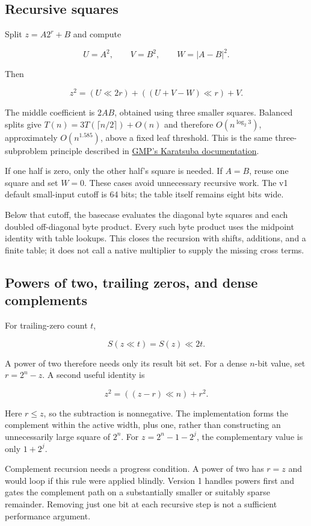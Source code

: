 \documentclass[11pt,a4paper]{article}
\begin{document}
\subsection{Recursive squares}

Split $z=A2^r+B$ and compute

\[
U=A^2,\qquad V=B^2,\qquad W=|A-B|^2.
\]

Then

\[
z^2=(U\ll2r)+((U+V-W)\ll r)+V.
\]

The middle coefficient is $2AB$, obtained using three smaller squares. Balanced splits give $T(n)=3T(\lceil n/2\rceil)+O(n)$ and therefore $O(n^{\log_2 3})$, approximately $O(n^{1.585})$, above a fixed leaf threshold. This is the same three-subproblem principle described in \href{\detokenize{https://gmplib.org/manual/Karatsuba-Multiplication}}{GMP's Karatsuba documentation}.

If one half is zero, only the other half's square is needed. If $A=B$, reuse one square and set $W=0$. These cases avoid unnecessary recursive work. The v1 default small-input cutoff is 64 bits; the table itself remains eight bits wide.

Below that cutoff, the basecase evaluates the diagonal byte squares and each doubled off-diagonal byte product. Every such byte product uses the midpoint identity with table lookups. This closes the recursion with shifts, additions, and a finite table; it does not call a native multiplier to supply the missing cross terms.

\subsection{Powers of two, trailing zeros, and dense complements}

For trailing-zero count $t$,

\[
S(z\ll t)=S(z)\ll2t.
\]

A power of two therefore needs only its result bit set. For a dense $n$-bit value, set $r=2^n-z$. A second useful identity is

\[
z^2=((z-r)\ll n)+r^2.
\]

Here $r\le z$, so the subtraction is nonnegative. The implementation forms the complement within the active width, plus one, rather than constructing an unnecessarily large square of $2^n$. For $z=2^n-1-2^j$, the complementary value is only $1+2^j$.

Complement recursion needs a progress condition. A power of two has $r=z$ and would loop if this rule were applied blindly. Version 1 handles powers first and gates the complement path on a substantially smaller or suitably sparse remainder. Removing just one bit at each recursive step is not a sufficient performance argument.
\end{document}
